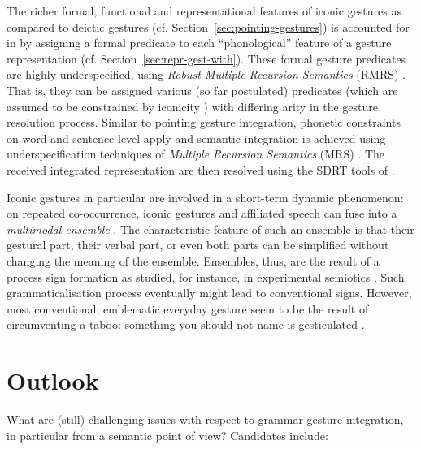 \documentclass[output=paper]{langsci/langscibook}
\begin{document}
The richer formal, functional and representational features of iconic gestures as compared to deictic gestures (cf. Section~\ref{sec:pointing-gestures}) is accounted for in \citet{Alahverdzhieva:Lascarides:2010} by assigning a formal predicate to each \enquote{phonological} feature of a gesture representation (cf. Section~\ref{sec:repr-gest-with}). 
%
These formal gesture predicates are highly underspecified, using \textit{Robust Multiple Recursion Semantics} (RMRS) \citep{Copestake:2007}.
%
That is, they can be assigned various (so far postulated) predicates (which are assumed to be constrained by iconicity \citep{Alahverdzhieva:Lascarides:2010}) with differing arity in the gesture resolution process.
%
Similar to pointing gesture integration, phonetic constraints on word and sentence level apply and semantic integration is achieved using underspecification techniques of \textit{Multiple Recursion Semantics} (MRS) \citep{Copestake:Flickinger:Pollard:Sag:2005}.
%
The received integrated representation are then resolved using the SDRT tools of \citet{Lascarides:Stone:2009:a}.



Iconic gestures in particular are involved in a short-term dynamic phenomenon:
%
on repeated co-occurrence, iconic gestures and affiliated speech can fuse into a \emph{multimodal ensemble} \citep{Kendon:2004,Luecking:Mehler:Menke:2008,Mehler:Luecking:2012:d}.  
%
The characteristic feature of such an ensemble is that their gestural part, their verbal part, or even both parts can be simplified without changing the meaning of the ensemble.
%
Ensembles, thus, are the result of a process sign formation as studied, for instance, in experimental semiotics \citet{Galantucci:Garrod:2011}.
%
Such grammaticalisation process eventually might lead to conventional signs.
%
However, most conventional, emblematic everyday gesture seem to be the result of circumventing a taboo: something you should not name is gesticulated \citep{Posner:2002}.
 



\section{Outlook}
\label{sec:outlook}

What are (still) challenging issues with respect to grammar-gesture integration, in particular from a semantic point of view? Candidates include:
\end{document}
